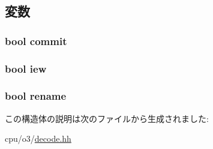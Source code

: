 \subsection{変数}
\hypertarget{structDefaultDecode_1_1Stalls_ad7d6b839c43385b5fffdf2beaff214ec}{
\subsubsection[{commit}]{\setlength{\rightskip}{0pt plus 5cm}bool {\bf commit}}}
\label{structDefaultDecode_1_1Stalls_ad7d6b839c43385b5fffdf2beaff214ec}
\hypertarget{structDefaultDecode_1_1Stalls_a69f40ab12e9825ce316dfa72651a7404}{
\subsubsection[{iew}]{\setlength{\rightskip}{0pt plus 5cm}bool {\bf iew}}}
\label{structDefaultDecode_1_1Stalls_a69f40ab12e9825ce316dfa72651a7404}
\hypertarget{structDefaultDecode_1_1Stalls_a5e8e124987c56967514ad546a9f9c09b}{
\subsubsection[{rename}]{\setlength{\rightskip}{0pt plus 5cm}bool {\bf rename}}}
\label{structDefaultDecode_1_1Stalls_a5e8e124987c56967514ad546a9f9c09b}


この構造体の説明は次のファイルから生成されました:\begin{DoxyCompactItemize}
\item 
cpu/o3/\hyperlink{decode_8hh}{decode.hh}\end{DoxyCompactItemize}
